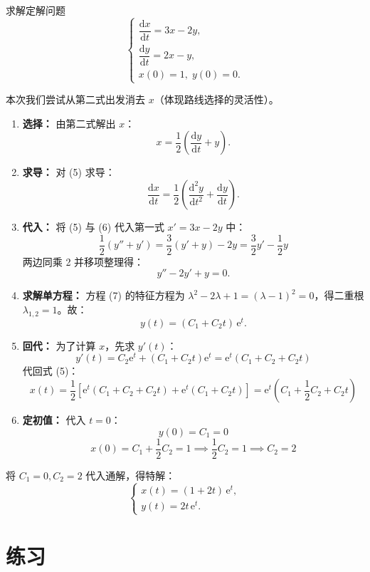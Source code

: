 \documentclass[lang=cn,11pt]{elegantbook}
\begin{document}
\begin{exercise} \label{ex:sys-elim-ex2}
求解定解问题
\[
\begin{cases}
\dfrac{\mathrm{d}x}{\mathrm{d}t}=3x-2y,\\[6pt]
\dfrac{\mathrm{d}y}{\mathrm{d}t}=2x-y,\\
x(0)=1,\;y(0)=0.
\end{cases}
\]
\end{exercise}
\begin{solution}
本次我们尝试从第二式出发消去 $x$（体现路线选择的灵活性）。
\begin{enumerate}
    \item \textbf{选择：} 由第二式解出 $x$：
    \[
    x=\frac12\left(\frac{\mathrm{d}y}{\mathrm{d}t}+y\right). \tag{5}
    \]
    \item \textbf{求导：} 对 (5) 求导：
    \[
    \frac{\mathrm{d}x}{\mathrm{d}t}=\frac12\left(\frac{\mathrm{d}^{2}y}{\mathrm{d}t^{2}}+\frac{\mathrm{d}y}{\mathrm{d}t}\right). \tag{6}
    \]
    \item \textbf{代入：} 将 (5) 与 (6) 代入第一式 $x'=3x-2y$ 中：
    \[
    \frac12\left(y''+y'\right) = \frac32(y'+y)-2y = \frac32y'-\frac12y
    \]
    两边同乘 2 并移项整理得：
    \[
    y''-2y'+y=0. \tag{7}
    \]
    \item \textbf{求解单方程：} 方程 (7) 的特征方程为 $\lambda^{2}-2\lambda+1=(\lambda-1)^{2}=0$，得二重根 $\lambda_{1,2}=1$。故：
    \[
    y(t)=(C_1+C_2t)\,\mathrm{e}^{t}. \tag{8}
    \]
    \item \textbf{回代：} 为了计算 $x$，先求 $y'(t)$：
    \[
    y'(t) = C_2\mathrm{e}^t + (C_1+C_2t)\mathrm{e}^t = \mathrm{e}^t(C_1 + C_2 + C_2t)
    \]
    代回式 (5)：
    \[
    x(t) = \frac12\left[\mathrm{e}^{t}(C_1+C_2+C_2t) + \mathrm{e}^{t}(C_1+C_2t)\right] = \mathrm{e}^{t}\left(C_1 + \frac{1}{2}C_2 + C_2t\right)
    \]
    \item \textbf{定初值：} 代入 $t=0$：
    \[
    y(0) = C_1 = 0
    \]
    \[
    x(0) = C_1 + \frac{1}{2}C_2 = 1 \implies \frac{1}{2}C_2 = 1 \implies C_2 = 2
    \]
\end{enumerate}
将 $C_1=0, C_2=2$ 代入通解，得特解：
\[
\boxed{
\begin{cases}
x(t)=(1+2t)\,\mathrm{e}^{t},\\[6pt]
y(t)=2t\,\mathrm{e}^{t}.
\end{cases}
}
\]
\end{solution}


\section{练习}
\end{document}
